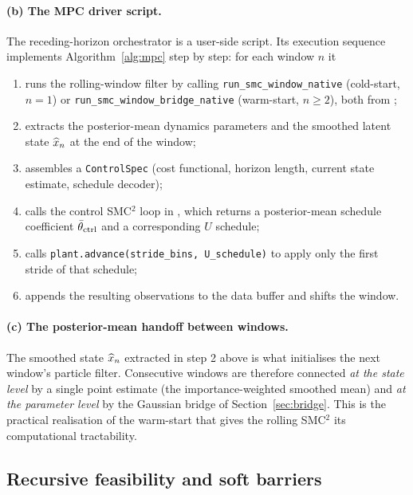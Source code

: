 \paragraph{(b) The MPC driver script.}
The receding-horizon orchestrator is a user-side script. Its
execution sequence implements Algorithm~\ref{alg:mpc} step by step:
for each window $n$ it
\begin{enumerate}
  \item runs the rolling-window filter by calling
        \texttt{run\_smc\_window\_native} (cold-start, $n=1$) or
        \texttt{run\_smc\_window\_bridge\_native} (warm-start,
        $n \ge 2$), both from
        ;
  \item extracts the posterior-mean dynamics parameters and the
        smoothed latent state $\widehat{x}_n$ at the end of the window;
  \item assembles a \texttt{ControlSpec} (cost functional, horizon
        length, current state estimate, schedule decoder);
  \item calls the control SMC$^2$ loop in
        , which returns a
        posterior-mean schedule coefficient $\bar\theta_{\rm ctrl}$
        and a corresponding $U$ schedule;
  \item calls
        \verb|plant.advance(stride_bins, U_schedule)| to apply only
        the first stride of that schedule;
  \item appends the resulting observations to the data buffer and
        shifts the window.
\end{enumerate}

\paragraph{(c) The posterior-mean handoff between windows.}
The smoothed state $\widehat{x}_n$ extracted in step 2 above is what
initialises the next window's particle filter. Consecutive windows
are therefore connected \emph{at the state level} by a single point
estimate (the importance-weighted smoothed mean) and
\emph{at the parameter level} by the Gaussian bridge of
Section~\ref{sec:bridge}. This is the practical realisation of the
warm-start that gives the rolling SMC$^2$ its computational
tractability.

\subsection{Recursive feasibility and soft barriers}
\label{sec:mpc-feasibility}

